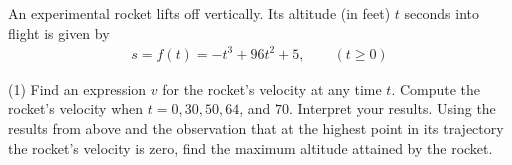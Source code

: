 \documentclass[../mathNotesPreamble]{subfiles}
\begin{document}
  \begin{ex*}
    An experimental rocket lifts off vertically. Its altitude (in feet) $t$ seconds into flight is given by
    \begin{align*}
      s=f(t)=-t^3+96t^2+5, \qquad (t\geq 0)
    \end{align*}
  \end{ex*}
  \begin{extasks}[after-item-skip=\stretch{1}](1)
    \task Find an expression $v$ for the rocket's velocity at any time $t$.
    \task Compute the rocket's velocity when $t=0, 30, 50, 64$, and $70$. Interpret your results.
    \task Using the results from above and the observation that at the highest point in its trajectory the rocket's velocity is zero, find the maximum altitude attained by the rocket.
  \end{extasks}
  \pagebreak

  \pagebreak
\end{document}
